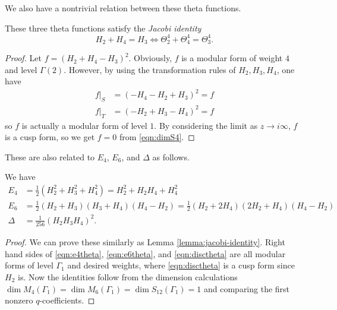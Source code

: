 We also have a nontrivial relation between these theta functions.
\begin{lemma}\label{lemma:jacobi-identity}\leanok
These three theta functions satisfy the \emph{Jacobi identity}
\begin{equation}\label{eqn:jacobi-identity}
H_{2} + H_{4} = H_{3} \Leftrightarrow \Theta_{2}^4 + \Theta_{4}^4 = \Theta_{3}^4.
\end{equation}
\end{lemma}
\begin{proof}
    \leanok
    Let $f = (H_2 + H_4 - H_3)^{2}$.
    Obviously, $f$ is a modular form of weight $4$ and level $\Gamma(2)$.
    However, by using the transformation rules of $H_2, H_3, H_4$, one have
    \begin{align}
        f|_{S} &= (-H_4 - H_2 + H_3)^{2} = f\\
        f|_{T} &= (-H_2 + H_3 - H_4)^{2} = f
    \end{align}
    so $f$ is actually a modular form of level $1$.
    By considering the limit as $z \to i\infty$, $f$ is a cusp form, so we get $f = 0$ from \eqref{eqn:dimS4}.
\end{proof}

These are also related to $E_4$, $E_6$, and $\Delta$ as follows.
\begin{lemma}\label{lemma:lv1-lv2-identities}
We have
\begin{align}
    E_4 &= \frac{1}{2}(H_{2}^{2} + H_{3}^{2} + H_{4}^{2}) = H_{2}^{2} + H_{2}H_{4} + H_{4}^{2} \label{eqn:e4theta} \\
    E_6 &= \frac{1}{2} (H_{2} + H_{3})(H_{3} + H_{4}) (H_{4} - H_{2}) = \frac{1}{2}(H_2 + 2H_4)(2H_2 + H_4)(H_4 - H_2) \label{eqn:e6theta} \\
    \Delta &= \frac{1}{256} (H_{2}H_{3}H_{4})^2. \label{eqn:disctheta}
\end{align}
\end{lemma}
\begin{proof}
We can prove these similarly as Lemma \ref{lemma:jacobi-identity}.
Right hand sides of \eqref{eqn:e4theta}, \eqref{eqn:e6theta}, and \eqref{eqn:disctheta} are all modular forms of level $\Gamma_1$ and desired weights, where \eqref{eqn:disctheta} is a cusp form since $H_2$ is.
Now the identities follow from the dimension calculations $\dim M_4(\Gamma_1) = \dim M_6(\Gamma_1) = \dim S_{12}(\Gamma_1) = 1$ and comparing the first nonzero $q$-coefficients.
\end{proof}

